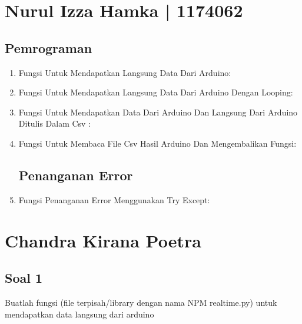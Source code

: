 
\section{Nurul Izza Hamka | 1174062}
\subsection{Pemrograman}
\begin{enumerate}

\item Fungsi Untuk Mendapatkan Langsung Data Dari Arduino:


\item Fungsi Untuk Mendapatkan Langsung Data Dari Arduino Dengan Looping:


\item Fungsi Untuk Mendapatkan Data Dari Arduino Dan Langsung Dari Arduino Ditulis Dalam Csv :


\item Fungsi Untuk Membaca File Csv Hasil Arduino Dan Mengembalikan Fungsi:


\subsection{Penanganan Error}

\item Fungsi Penanganan Error Menggunakan Try Except:



\end{enumerate}

\section{Chandra Kirana Poetra}

\subsection{Soal 1}
Buatlah fungsi (file terpisah/library dengan nama NPM realtime.py) untuk mendapatkan data langsung dari arduino



